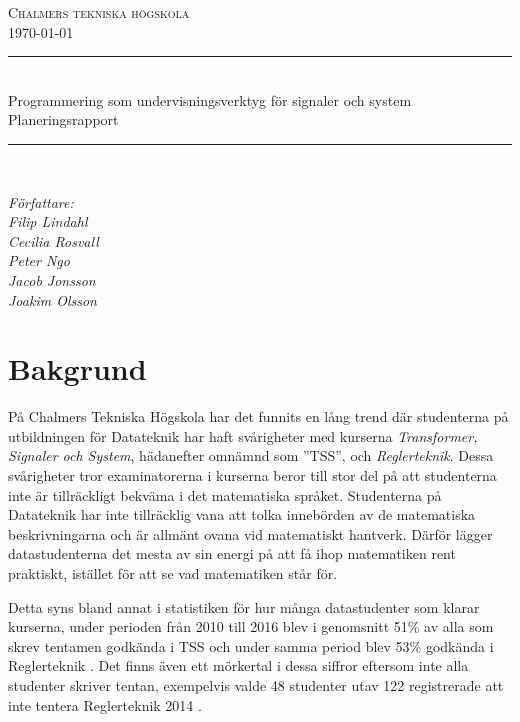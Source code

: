 \documentclass{article}
\begin{document}
\begin{titlepage} \newcommand{\HRule}{\rule{\linewidth}{0.3mm}}
\center
\textsc{\Large Chalmers tekniska högskola}\\[0.05cm]
\normalsize \today

\HRule \\[0.08cm]
{ \large  Programmering som undervisningsverktyg för signaler och system \\ \normalsize{Planeringsrapport}}\\[0.08cm] %
\HRule \\[0.3cm]

\vfill

\begin{flushleft} \small
    \emph{Författare: \\
    \quad Filip Lindahl\\
    \quad Cecilia Rosvall\\
    \quad Peter Ngo\\
    \quad Jacob Jonsson\\
    \quad Joakim Olsson\\}
\end{flushleft}
\end{titlepage}
\newpage
\tableofcontents
\newpage

\section{Bakgrund}
På Chalmers Tekniska Högskola har det funnits en lång trend
där studenterna på utbildningen för Datateknik har haft
svårigheter med kurserna \textit{Transformer, Signaler och System},
hädanefter omnämnd som ''TSS'', och \textit{Reglerteknik}.
Dessa svårigheter tror examinatorerna i kurserna beror till
stor del på att studenterna inte är tillräckligt bekväma
i det matematiska språket.
Studenterna på Datateknik har inte tillräcklig vana att
tolka innebörden av de matematiska beskrivningarna och är
allmänt ovana vid matematiskt hantverk.
Därför lägger datastudenterna det mesta av sin energi
på att få ihop matematiken rent praktiskt,
istället för att se vad matematiken står för.

Detta syns bland annat i statistiken för hur många
datastudenter som klarar kurserna, under perioden från
2010 till 2016 blev i genomsnitt 51\% av alla som skrev
tentamen godkända i TSS och under samma period blev
53\% godkända i Reglerteknik \cite{tentastatistik}.
Det finns även ett mörkertal i dessa siffror eftersom
inte alla studenter skriver tentan, exempelvis
valde 48 studenter utav 122 registrerade att inte
tentera Reglerteknik 2014 \cite{kursinformation:ere102:14-15}.
\end{document}
